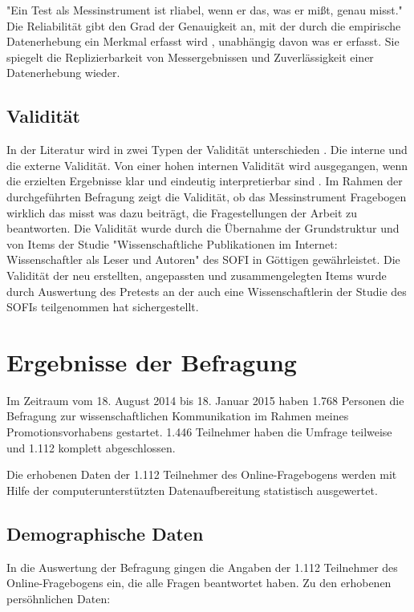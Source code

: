 "Ein Test als Messinstrument ist rliabel, wenn er das, was er mißt, genau misst." \cite{schelten_1997_testbeurteilung} Die Reliabilität gibt den Grad der Genauigkeit an, mit der durch die empirische Datenerhebung ein Merkmal erfasst wird \cite{rost_2004_lehrbuch}, unabhängig davon was er erfasst. Sie spiegelt die Replizierbarkeit von Messergebnissen und Zuverlässigkeit einer Datenerhebung wieder.

\subsection{Validität}
In der Literatur wird in zwei Typen der Validität unterschieden \cite{rost_2004_lehrbuch}. Die interne und die externe Validität. Von einer hohen internen Validität wird ausgegangen, wenn die erzielten Ergebnisse klar und eindeutig interpretierbar sind \cite{raab_2012_fragebogen}. Im Rahmen der durchgeführten Befragung zeigt die Validität, ob das Messinstrument Fragebogen wirklich das misst was dazu beiträgt, die Fragestellungen der Arbeit zu beantworten. Die Validität wurde durch die Übernahme der Grundstruktur und von Items der Studie "Wissenschaftliche Publikationen im Internet: Wissenschaftler als Leser und Autoren" des SOFI in Göttigen gewährleistet. Die Validität der neu erstellten, angepassten  und zusammengelegten Items wurde durch Auswertung des Pretests an der auch eine Wissenschaftlerin der Studie des SOFIs teilgenommen hat sichergestellt.

\section{Ergebnisse der Befragung}

Im Zeitraum vom 18. August 2014 bis 18. Januar 2015 haben 1.768 Personen die Befragung zur wissenschaftlichen Kommunikation im Rahmen meines Promotionsvorhabens gestartet. 1.446 Teilnehmer haben die Umfrage teilweise und 1.112 komplett abgeschlossen.

Die erhobenen Daten der 1.112 Teilnehmer des Online-Fragebogens werden mit Hilfe der computerunterstützten Datenaufbereitung statistisch ausgewertet. 

\subsection{Demographische Daten}

In die Auswertung der Befragung gingen die Angaben der 1.112 Teilnehmer des Online-Fragebogens ein, die alle Fragen beantwortet haben. Zu den erhobenen persöhnlichen Daten:

